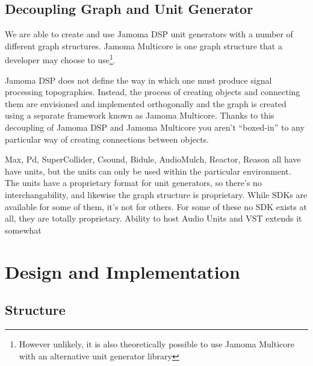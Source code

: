 \documentclass[twoside,a4paper]{article}
\begin{document}



\subsection{Decoupling Graph and Unit Generator} %

We are able to create and use Jamoma DSP unit generators with a number of different graph structures.  Jamoma Multicore is one graph structure that a developer may choose to use\footnote{However unlikely, it is also theoretically possible to use Jamoma Multicore with an alternative unit generator library}.

Jamoma DSP does not define the way in which one must produce signal processing topographies.  Instead, the process of creating objects and connecting them are envisioned and implemented orthogonally and the graph is created using a separate framework known as Jamoma Multicore.  Thanks to this decoupling of Jamoma DSP and Jamoma Multicore you aren't ``boxed-in'' to any particular way of creating connections between objects.

Max, Pd, SuperCollider, Csound, Bidule, AudioMulch, Reactor, Reason all have have units, but the units can only be used within the particular environment. The units have a proprietary format for unit generators, so there's no interchangability, and likewise the graph structure is proprietary. While SDKs are available for some of them, it's not for others. For some of these no SDK exists at all, they are totally proprietary. Ability to host Audio Units and VST extends it somewhat







\section{Design and Implementation} %

\subsection{Structure} %
\end{document}
